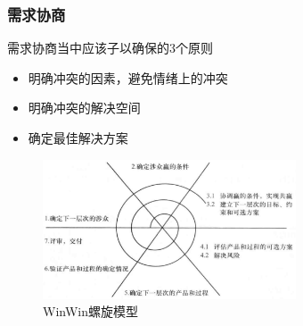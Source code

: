 \subsubsection{需求协商}
需求协商当中应该子以确保的3个原则
\vspace{-0.8em}
\begin{multicols}{2}
    \begin{itemize}
        \item 明确冲突的因素，避免情绪上的冲突
        \item 明确冲突的解决空间
        \item 确定最佳解决方案 
    \end{itemize}
\end{multicols}
\vspace{-1em}

\begin{figure}[H]
	\centering
    \vspace{-0.8em}
	\includegraphics[width=0.67\textwidth]{img/WinWin螺旋模型.png}
    \caption*{WinWin螺旋模型}
    \vspace{-1em}
\end{figure}

